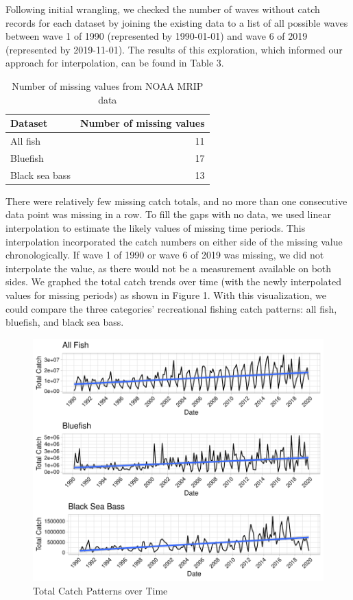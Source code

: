 \documentclass[
  12pt,
]{article}
\begin{document}
Following initial wrangling, we checked the number of waves without
catch records for each dataset by joining the existing data to a list of
all possible waves between wave 1 of 1990 (represented by 1990-01-01)
and wave 6 of 2019 (represented by 2019-11-01). The results of this
exploration, which informed our approach for interpolation, can be found
in Table 3.

\begin{table}[H]

\caption{\label{tab:table3}Number of missing values from NOAA MRIP data}
\centering
\begin{tabular}[t]{l|r}
\hline
Dataset & Number of missing values\\
\hline
All fish & 11\\
\hline
Bluefish & 17\\
\hline
Black sea bass & 13\\
\hline
\end{tabular}
\end{table}

There were relatively few missing catch totals, and no more than one
consecutive data point was missing in a row. To fill the gaps with no
data, we used linear interpolation to estimate the likely values of
missing time periods. This interpolation incorporated the catch numbers
on either side of the missing value chronologically. If wave 1 of 1990
or wave 6 of 2019 was missing, we did not interpolate the value, as
there would not be a measurement available on both sides. We graphed the
total catch trends over time (with the newly interpolated values for
missing periods) as shown in Figure 1. With this visualization, we could
compare the three categories' recreational fishing catch patterns: all
fish, bluefish, and black sea bass.

\begin{figure}[H]

\hfill{}\includegraphics{Report_FishTrends_files/figure-latex/ggplot-1} 

\caption{Total Catch Patterns over Time}\label{fig:ggplot}
\end{figure}
\end{document}
